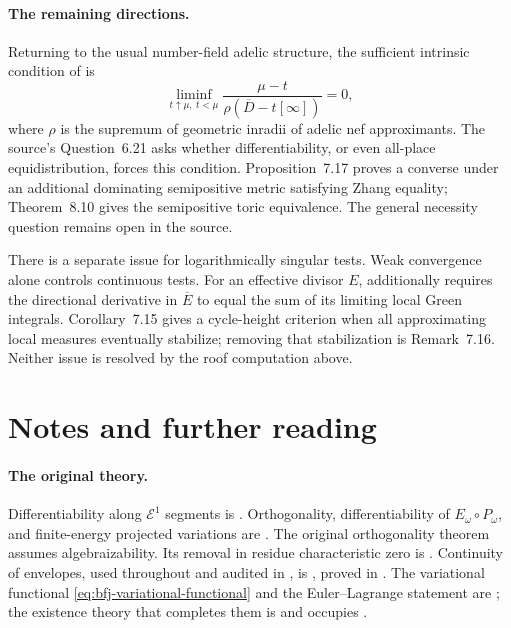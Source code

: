 \paragraph{The remaining directions.}
Returning to the usual number-field adelic structure, the sufficient intrinsic condition
of \cite[Theorem~6.17]{BallaySombra26Published} is
\[
 \liminf_{t\uparrow\mu,\ t<\mu}
       \frac{\mu-t}{\rho(\overline D-t[\infty])}=0,
\]
where $\rho$ is the supremum of geometric inradii of adelic nef
approximants. The source's Question~6.21 asks whether
differentiability, or even all-place equidistribution, forces this
condition. Proposition~7.17 proves a converse under an additional
dominating semipositive metric satisfying Zhang equality;
Theorem~8.10 gives the semipositive toric equivalence. The general
necessity question remains open in the source.

There is a separate issue for logarithmically singular tests.
Weak convergence alone controls continuous tests. For an effective
divisor $E$, \cite[Theorem~7.13]{BallaySombra26Published} additionally
requires the directional derivative in $\overline E$ to equal the
sum of its limiting local Green integrals. Corollary~7.15 gives a
cycle-height criterion when all approximating local measures
eventually stabilize; removing that stabilization is Remark~7.16.
Neither issue is resolved by the roof computation above.

\section*{Notes and further reading}

\enlargethispage{4\baselineskip}

\paragraph{The original theory.}
Differentiability along $\mathcal E^1$ segments is
\cite[Proposition~6.12]{BFJ15}. Orthogonality, differentiability of
$E_\omega\circ P_\omega$, and finite-energy projected variations are
\cite[Appendix~A, Theorem~7.2, and Corollary~7.3]{BFJ15}. The original
orthogonality theorem assumes algebraizability. Its removal in residue
characteristic zero is \cite[Theorem~6.3.3]{BGGJKM20}.  Continuity of
envelopes, used throughout and audited in
, is \cite[Theorem~8.3]{BFJ16}, proved in
.  The variational functional
\eqref{eq:bfj-variational-functional} and the Euler--Lagrange statement
 are \cite[\S7]{BFJ15}; the existence theory
that completes them is \cite[\S8]{BFJ15} and occupies
.

